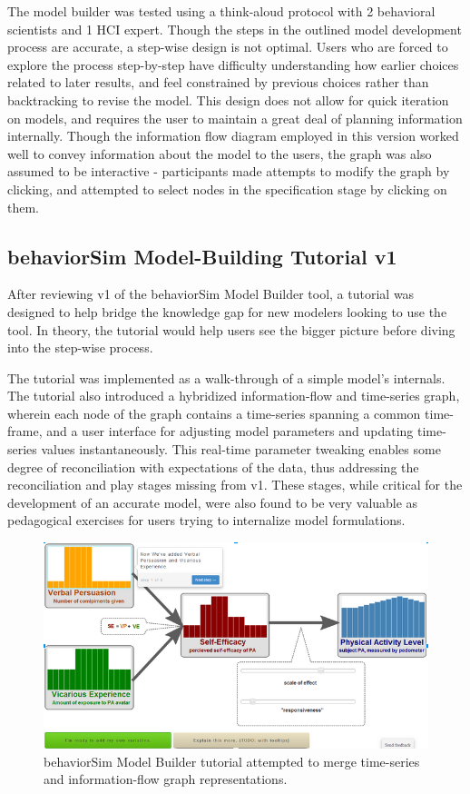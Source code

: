 \documentclass[conference]{IEEEtran}
\begin{document}
The model builder was tested using a think-aloud protocol with 2 behavioral scientists and 1 HCI expert. 
Though the steps in the outlined model development process are accurate, a step-wise design is not optimal.
Users who are forced to explore the process step-by-step have difficulty understanding how earlier choices related to later results, and feel constrained by previous choices rather than backtracking to revise the model.
This design does not allow for quick iteration on models, and requires the user to maintain a great deal of planning information internally.
Though the information flow diagram employed in this version worked well to convey information about the model to the users, the graph was also assumed to be interactive - participants made attempts to modify the graph by clicking, and attempted to select nodes in the specification stage by clicking on them.

\subsection{behaviorSim Model-Building Tutorial v1}
After reviewing v1 of the behaviorSim Model Builder tool, a tutorial was designed to help bridge the knowledge gap for new modelers looking to use the tool.
In theory, the tutorial would help users see the bigger picture before diving into the step-wise process.

The tutorial was implemented as a walk-through of a simple model's internals.
The tutorial also introduced a hybridized information-flow and time-series graph, wherein each node of the graph contains a time-series spanning a common time-frame, and a user interface for adjusting model parameters and updating time-series values instantaneously.
This real-time parameter tweaking enables some degree of reconciliation with expectations of the data, thus addressing the reconciliation and play stages missing from v1.
These stages, while critical for the development of an accurate model, were also found to be very valuable as pedagogical exercises for users trying to internalize model formulations.
 
\begin{figure}[!t]
  \centering
  \includegraphics[width=0.9\columnwidth]{img/v1-flow}  
  \caption{behaviorSim Model Builder tutorial attempted to merge time-series and information-flow graph representations.}
  \label{model-builder-tutorial}
\end{figure}
\end{document}
